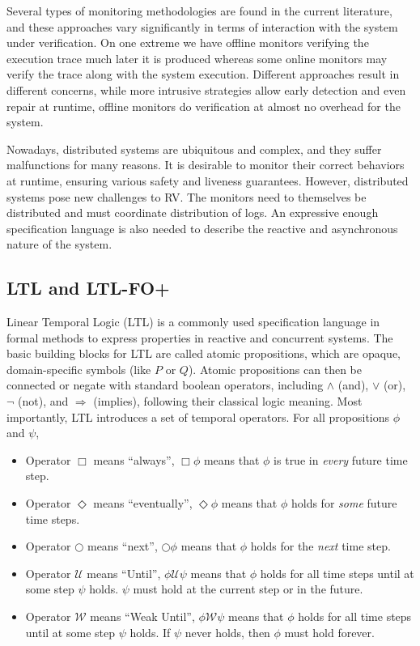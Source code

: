 \documentclass[format=acmsmall, nonacm=true, review=true, screen=true]{acmart}
\begin{document}
Several types of monitoring methodologies are found in the current literature, and these approaches vary significantly in terms of interaction with the system under verification. On one extreme we have offline monitors verifying the execution trace much later it is produced whereas some online monitors may verify the trace along with the system execution. Different approaches result in different concerns, while more intrusive strategies allow early detection and even repair at runtime, offline monitors do verification at almost no overhead for the system.

Nowadays, distributed systems are ubiquitous and complex, and they suffer malfunctions for many reasons. It is desirable to monitor their correct behaviors at runtime, ensuring various safety and liveness guarantees. However, distributed systems pose new challenges to RV. The monitors need to themselves be distributed and must coordinate distribution of logs. An expressive enough specification language is also needed to describe the reactive and asynchronous nature of the system.

\subsection{LTL and LTL-FO+}
Linear Temporal Logic (LTL) is a commonly used specification language in formal methods to express properties in reactive and concurrent systems. The basic building blocks for LTL are called atomic propositions, which are opaque, domain-specific symbols (like $P$ or $Q$). Atomic propositions can then be connected or negate with standard boolean operators, including $\land$ (and), $\lor$ (or), $\lnot$ (not), and $\Rightarrow$ (implies), following their classical logic meaning. Most importantly, LTL introduces a set of temporal operators. For all propositions $\phi$ and $\psi$,
\begin{itemize}
  \item Operator $\Box$ means ``always'', $\Box \phi$ means that $\phi$ is true in \textit{every} future time step.
  \item Operator $\Diamond$ means ``eventually'', $\Diamond \phi$ means that $\phi$ holds for \textit{some} future time steps.
  \item Operator $\bigcirc$ means ``next'', $\bigcirc \phi$ means that $\phi$ holds for the \textit{next} time step.
  \item Operator $\mathcal{U}$ means ``Until'', $\phi \mathcal{U}\psi$ means that $\phi$ holds for all time steps until at some step $\psi$ holds. $\psi$ must hold at the current step or in the future.
  \item Operator $\mathcal{W}$ means ``Weak Until'', $\phi \mathcal{W}\psi$ means that $\phi$ holds for all time steps until at some step $\psi$ holds. If $\psi$ never holds, then $\phi$ must hold forever.
\end{itemize}
\end{document}
